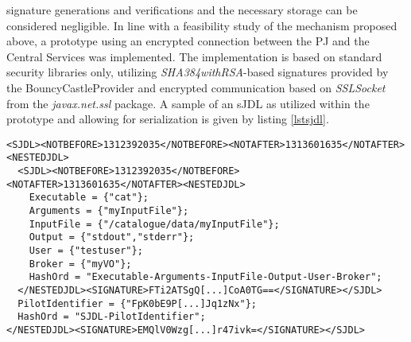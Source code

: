 \documentclass[10pt]{iopart}
\begin{document}
signature generations and verifications and the necessary storage can be
considered negligible. In line with a feasibility study of the mechanism proposed above,
a prototype
using an encrypted connection between the PJ and the Central Services was
implemented. The implementation is
based on standard security libraries only, utilizing
\textit{SHA384withRSA}-based
signatures provided by the BouncyCastleProvider\cite{bouncy} and encrypted
communication based on \textit{SSLSocket} from the \textit{javax.net.ssl}
package. A sample of an sJDL as utilized within the prototype and allowing for
serialization is given by listing \ref{lstsjdl}.
\begin{lstlisting}[captionpos=b,caption=A sample sJDL (identifier
and signatures truncated),
label=lstsjdl,basicstyle=\ttfamily\fontsize{7}{11}\selectfont]
<SJDL><NOTBEFORE>1312392035</NOTBEFORE><NOTAFTER>1313601635</NOTAFTER><NESTEDJDL>
  <SJDL><NOTBEFORE>1312392035</NOTBEFORE><NOTAFTER>1313601635</NOTAFTER><NESTEDJDL>
    Executable = {"cat"};
    Arguments = {"myInputFile"};
    InputFile = {"/catalogue/data/myInputFile"};
    Output = {"stdout","stderr"};
    User = {"testuser"};
    Broker = {"myVO"};
    HashOrd = "Executable-Arguments-InputFile-Output-User-Broker";
  </NESTEDJDL><SIGNATURE>FTi2ATSgQ[...]CoA0TG==</SIGNATURE></SJDL>
  PilotIdentifier = {"FpK0bE9P[...]Jq1zNx"};
  HashOrd = "SJDL-PilotIdentifier";
</NESTEDJDL><SIGNATURE>EMQlV0Wzg[...]r47ivk=</SIGNATURE></SJDL>
\end{lstlisting}
\end{document}
